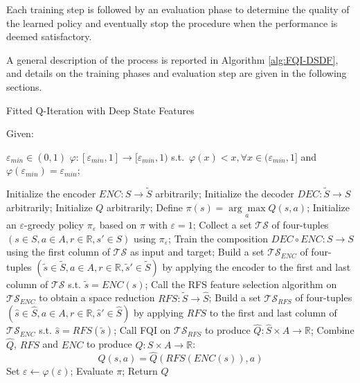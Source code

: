 Each training step is followed by an evaluation phase to determine the quality 
of the learned policy and eventually stop the procedure when the performance is 
deemed satisfactory.

A general description of the process is reported in Algorithm \ref{alg:FQI-DSDF},
and details on the training phases and evaluation step are given in the 
following sections. 
%
\begin{algorithm}[h]
    \caption{Fitted Q-Iteration with Deep State Features}
    \label{alg:FQI-DSDF}
    \begin{algorithmic}
	\STATE Given: 
	    \begin{ALC@g}
	        \STATE $\varepsilon_{min} \in (0, 1)$
	        \STATE $\varphi: [\varepsilon_{min}, 1] \rightarrow [\varepsilon_{min}, 1)$ s.t.\ $\varphi(x) < x, \forall x \in (\varepsilon_{min}, 1]$ and $\varphi(\varepsilon_{min}) = \varepsilon_{min}$;
	    \end{ALC@g}
	\STATE Initialize the encoder $ENC: S \rightarrow \tilde{S}$ arbitrarily;
	\STATE Initialize the decoder $DEC: \tilde{S} \rightarrow S$ arbitrarily;
	\STATE Initialize $Q$ arbitrarily;
	\STATE Define $\pi(s) = \underset{a}{\arg\max} Q(s, a)$;
	\STATE Initialize an $\varepsilon$-greedy policy $\pi_\varepsilon$ based on $\pi$ with $\varepsilon = 1$;
	\REPEAT 
	    \STATE Collect a set $\mathcal{TS}$ of four-tuples $(s \in S, a \in A, r \in \mathbb{R}, s' \in S)$ using $\pi_\varepsilon$;
	    \STATE Train the composition $DEC \circ ENC: S \rightarrow S$ using the first column of $\mathcal{TS}$ as input and target;
	    \STATE Build a set $\mathcal{TS}_{ENC}$ of four-tuples $(\tilde{s} \in \tilde{S}, a \in A, r \in \mathbb{R}, \tilde{s}' \in \tilde{S})$ by applying the encoder to the first and last column of $\mathcal{TS}$ s.t. $\tilde{s} = ENC(s)$;
	    \STATE Call the RFS feature selection algorithm on $\mathcal{TS}_{ENC}$ to obtain a space reduction $RFS: \tilde{S} \rightarrow \hat{S}$;
	    \STATE Build a set $\mathcal{TS}_{RFS}$ of four-tuples $(\hat{s} \in \hat{S}, a \in A, r \in \mathbb{R}, \hat{s}' \in \hat{S})$ by applying $RFS$ to the first and last column of $\mathcal{TS}_{ENC}$ s.t. $\hat{s} = RFS(\tilde{s})$;
	    \STATE Call FQI on $\mathcal{TS}_{RFS}$ to produce $\hat{Q}: \hat{S} \times A \rightarrow \mathbb{R}$;
	    \STATE Combine $\hat{Q}$, $RFS$ and $ENC$ to produce $Q: S \times A \rightarrow \mathbb{R}$:
		\[
		    Q(s, a) = \hat{Q}(RFS(ENC(s)), a)
		\]
	    \STATE Set $\varepsilon \leftarrow \varphi(\varepsilon)$;
	    \STATE Evaluate $\pi$; 
	\STATE Return $Q$
    \end{algorithmic}
\end{algorithm}
